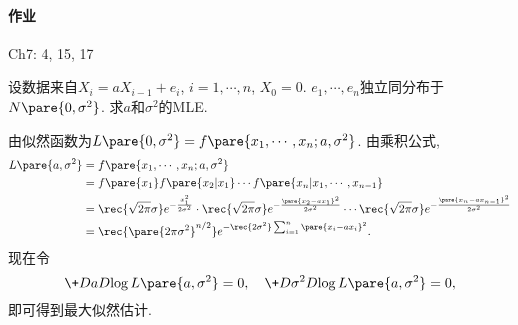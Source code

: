 \documentclass[../Statistics.tex]{subfiles}
\begin{document}
\paragraph{作业} %
\label{par:作业}

Ch7: 4, 15, 17


\begin{sample}
    \begin{ex}
        设数据来自$X_i = aX_{i-1}+e_i$, $i = 1,\cdots,n$, $X_0 = 0$. $e_1,\cdots,e_n$独立同分布于$N\pare{0,\sigma^2}$. 求$a$和$\sigma^2$的MLE.
    \end{ex}
    \begin{solution}
        由似然函数为$L\pare{0,\sigma^2} = f\pare{x_1,\cdots,x_n;a,\sigma^2}$. 由乘积公式,
        \begin{align*}
            L\pare{a,\sigma^2} &= f\pare{x_1,\cdots,x_n;a,\sigma^2} \\
            &= f\pare{x_1} f\pare{x_2\vert x_1} \cdots f\pare{x_n\vert x_1,\cdots,x_{n-1}} \\
            &= \rec{\sqrt{2\pi}\sigma} e^{-\frac{x_1^2}{2\sigma^2}} \cdot \rec{\sqrt{2\pi}\sigma}e^{- \frac{\pare{x_2 - ax_1}^2}{2\sigma^2}} \cdots \rec{\sqrt{2\pi}\sigma} e^{- \frac{\pare{x_n - ax_{n-1}}^2}{2\sigma^2}} \\
            &= \rec{\pare{2\pi \sigma^2}^{n/2}}e^{-\rec{2\sigma^2}\sum_{i=1}^n \pare{x_i - ax_i}^2}.
        \end{align*}
        现在令
        \[ \+DaD{\log L\pare{a,\sigma^2}} = 0,\quad \+D{\sigma^2}D{\log L\pare{a,\sigma^2}} = 0, \]
        即可得到最大似然估计.
    \end{solution}
\end{sample}
\end{document}
